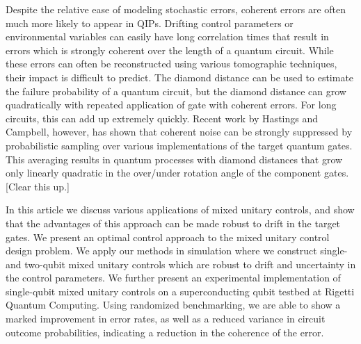 \documentclass[aps,nofootinbib,pra,notitlepage,twocolumn]{revtex4-1}
\newcommand{\note}[1]{{\color{red}[#1]}}
\begin{document}
Despite the relative ease of modeling stochastic errors, coherent errors are often much more likely to appear in QIPs. Drifting control parameters or environmental variables can easily have long correlation times that result in errors which is strongly coherent over the length of a quantum circuit. While these errors can often be reconstructed using various tomographic techniques, their impact is difficult to predict. The diamond distance can be used to estimate the failure probability of a quantum circuit, but the diamond distance can grow quadratically with repeated application of gate with coherent errors. For long circuits, this can add up extremely quickly. Recent work by Hastings and Campbell\cite{Campbell2017, 1612.01011, 1811.08017}, however, has shown that coherent noise can be strongly suppressed by probabilistic sampling over various implementations of the target quantum gates. This averaging results in quantum processes with diamond distances that grow only linearly  quadratic in the over/under rotation angle of the component gates. \note{Clear this up.}

In this article we discuss various applications of mixed unitary controls, and show that the advantages of this approach can be made robust to drift in the target gates. We present an optimal control approach to the mixed unitary control design problem. We apply our methods in simulation where we construct single- and two-qubit mixed unitary controls which are robust to drift and uncertainty in the control parameters. We further present an experimental implementation of single-qubit mixed unitary controls on a superconducting qubit testbed at Rigetti Quantum Computing. Using randomized benchmarking, we are able to show a marked improvement in error rates, as well as a reduced variance in circuit outcome probabilities, indicating a reduction in the coherence of the error.



\end{document}
